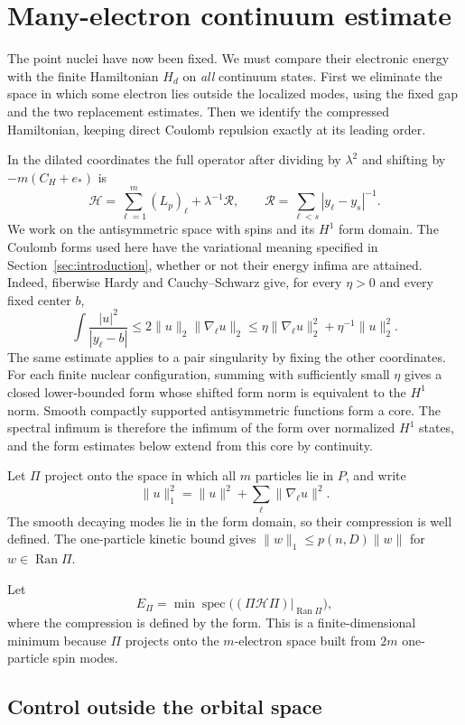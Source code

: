 \section{Many-electron continuum estimate}\label{sec:many-body}

The point nuclei have now been fixed. We must compare their electronic
energy with the finite Hamiltonian $H_d$ on \emph{all} continuum states.
First we eliminate the space in which some electron lies outside the
localized modes, using the fixed gap and the two replacement estimates.
Then we identify the compressed Hamiltonian, keeping direct Coulomb
repulsion exactly at its leading order.

In the dilated coordinates the full operator after dividing by \(\lambda^2\) and shifting by \(-m(C_H+e_*)\) is
\[
             \mathcal H=\sum_{\ell=1}^m (L_p)_\ell+\lambda^{-1}\mathcal R,
           \qquad \mathcal R=\sum_{\ell<s}|y_\ell-y_s|^{-1}.
\]
We work on the antisymmetric space with spins and its $H^1$ form domain.
The Coulomb forms used here have the variational meaning specified in
Section~\ref{sec:introduction}, whether or not their energy infima are
attained. Indeed, fiberwise Hardy and Cauchy--Schwarz give, for every
$\eta>0$ and every fixed center $b$,
\[
 \int\frac{|u|^2}{|y_\ell-b|}
 \le 2\|u\|_2\|\nabla_\ell u\|_2
 \le \eta\|\nabla_\ell u\|_2^2+\eta^{-1}\|u\|_2^2.
\]
The same estimate applies to a pair singularity by fixing the other
coordinates. For each finite nuclear configuration, summing with
sufficiently small $\eta$ gives a closed lower-bounded form whose shifted
form norm is equivalent to the $H^1$ norm. Smooth compactly supported
antisymmetric functions form a core. The spectral infimum is therefore
the infimum of the form over normalized $H^1$ states, and the form
estimates below extend from this core by continuity.

Let $\Pi$ project onto the space in which all $m$ particles lie in $P$,
and write
\[
 \|u\|_1^2=\|u\|^2+\sum_\ell\|\nabla_\ell u\|^2.
\]
The smooth decaying modes lie in the form domain, so their compression is
well defined. The one-particle kinetic bound gives
$\|w\|_1\le p(n,D)\|w\|$ for $w\in\operatorname{Ran}\Pi$.

Let
\[
 E_\Pi=\min\operatorname{spec}
       \bigl((\Pi\mathcal H\Pi)|_{\operatorname{Ran}\Pi}\bigr),
\]
where the compression is defined by the form. This is a finite-dimensional
minimum because $\Pi$ projects onto the $m$-electron space built from
$2m$ one-particle spin modes.

\subsection{Control outside the orbital space}\label{subsec:complement-control}

